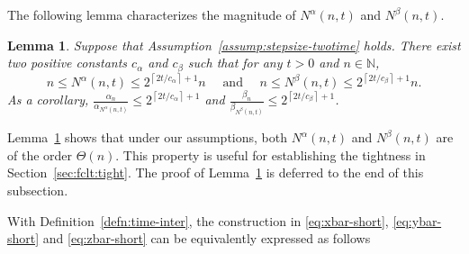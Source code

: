 \documentclass[11pt]{article}
\theoremstyle{plain}
\newtheorem{lem}{Lemma}[section]
\theoremstyle{definition}
\def\NB{{\mathbb N}}
\begin{document}
\begin{appendix}
The following lemma characterizes the magnitude of $N^\alpha(n,t)$ and $N^\beta(n,t)$. 
\begin{lem}\label{lem:aux:bounded}
Suppose that Assumption~\ref{assump:stepsize-twotime} holds.
There exist two positive constants $c_\alpha$ and $c_\beta$ such that for any $t>0$ and $n \in \NB$,
\begin{equation*}
    n \le N^\alpha(n,t) \le 2^{ \left\lceil 2t/c_\alpha \right\rceil + 1} n \quad \text{ and } \quad 
    n \le N^\beta(n,t) \le 2^{ \left\lceil 2t/c_\beta \right\rceil + 1} n.
\end{equation*}
As a corollary, 
$\frac{\alpha_{n}}{ \alpha_{N^\alpha (n, t) } } 
\le 2^{ \left\lceil 2t/c_\alpha \right\rceil + 1}$ and $\frac{\beta_{n}}{ \beta_{N^\beta (n, t) } } 
\le 2^{ \left\lceil 2t/c_\beta \right\rceil + 1}$.
\end{lem}

Lemma~\ref{lem:aux:bounded} shows that under our assumptions, both $N^\alpha(n,t)$ and $N^\beta(n,t)$ are of the order $\Theta(n)$. This property is useful for establishing the tightness in Section~\ref{sec:fclt:tight}. The proof of Lemma~\ref{lem:aux:bounded} is deferred to the end of this subsection. 

With Definition~\ref{defn:time-inter}, the construction in \eqref{eq:xbar-short}, \eqref{eq:ybar-short} and \eqref{eq:zbar-short} can be equivalently expressed as follows


\end{appendix}
\end{document}
